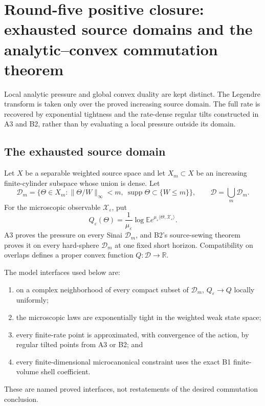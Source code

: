 \section{Round-five positive closure: exhausted source domains and the analytic--convex commutation theorem}
\label{sec:r5-d1}

Local analytic pressure and global convex duality are kept distinct.  The
Legendre transform is taken only over the proved increasing source domain.
The full rate is recovered by exponential tightness and the rate-dense regular
tilts constructed in A3 and B2, rather than by evaluating a local pressure
outside its domain.

\subsection{The exhausted source domain}

Let \(X\) be a separable weighted source space and let
\(X_m\subset X\) be an increasing finite-cylinder subspace whose union is
dense.  Let
\[
 \mathcal D_m=\{\Theta\in X_m:
 \|\Theta/W\|_\infty<m,\ \operatorname{supp}\Theta\subset\{W\le m\}\},
 \qquad \mathcal D=\bigcup_m\mathcal D_m.
\]
For the microscopic observable \(\mathcal X_\varepsilon\), put
\[
 Q_\varepsilon(\Theta)=
 \frac1{\mu_\varepsilon}
 \log\mathbb E e^{\mu_\varepsilon
 \langle\Theta,\mathcal X_\varepsilon\rangle}.
\]
A3 proves the pressure on every Sinai \(\mathcal D_m\), and B2's source-sewing
theorem proves it on every hard-sphere \(\mathcal D_m\) at one fixed short
horizon.  Compatibility on overlaps defines a proper convex function
\(Q:\mathcal D\to\mathbb R\).

The model interfaces used below are:
\begin{enumerate}[label=(P\arabic*)]
\item on a complex neighborhood of every compact subset of \(\mathcal D_m\),
      \(Q_\varepsilon\to Q\) locally uniformly;
\item the microscopic laws are exponentially tight in the weighted weak
      state space;
\item every finite-rate point is approximated, with convergence of the action,
      by regular tilted points from A3 or B2; and
\item every finite-dimensional microcanonical constraint uses the exact B1
      finite-volume shell coefficient.
\end{enumerate}
These are named proved interfaces, not restatements of the desired
commutation conclusion.

